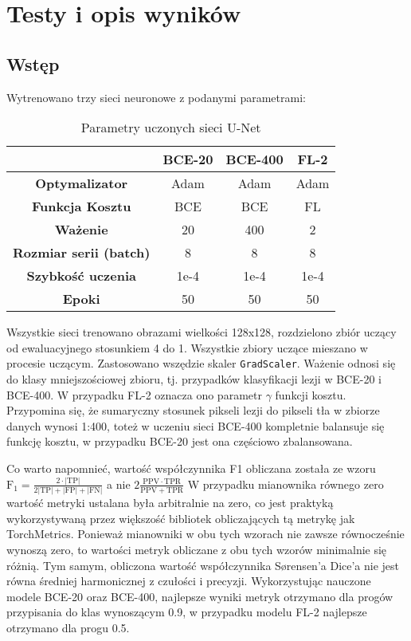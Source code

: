 \section{Testy i opis wyników}
\label{sec:Tests}
\subsection{Wstęp}

Wytrenowano trzy sieci neuronowe z podanymi parametrami:
\begin{table}[H]
	\centering
	\caption{Parametry uczonych sieci U-Net}
	\begin{tabular}{|c|c|c|c|}
		\hline
		\textbf{} & \textbf{BCE-20} & \textbf{BCE-400} & \textbf{FL-2} \\
		\hline
		\textbf{Optymalizator} & Adam & Adam & Adam \\
		\hline
		\textbf{Funkcja Kosztu} & BCE & BCE & FL \\
		\hline
		\textbf{Ważenie} & 20 & 400 & 2 \\
		\hline
		\textbf{Rozmiar serii (batch)} & 8 & 8 & 8 \\
		\hline
		\textbf{Szybkość uczenia} &1e-4 & 1e-4&1e-4\\
		\hline
		\textbf{Epoki} & 50  & 50 & 50 \\
		\hline
	\end{tabular}
	\label{tab:mytable}
\end{table}
\par
Wszystkie sieci trenowano obrazami wielkości 128x128, rozdzielono zbiór uczący od ewaluacyjnego stosunkiem 4 do 1. Wszystkie zbiory uczące mieszano w procesie uczącym. Zastosowano wszędzie skaler \texttt{GradScaler}. Ważenie odnosi się do klasy mniejszościowej zbioru, tj. przypadków klasyfikacji lezji w BCE-20 i BCE-400. W przypadku FL-2 oznacza ono parametr $\gamma$ funkcji kosztu. Przypomina się, że sumaryczny stosunek pikseli lezji do pikseli tła w zbiorze danych wynosi 1:400, toteż w uczeniu sieci BCE-400 kompletnie balansuje się funkcję kosztu, w przypadku BCE-20 jest ona częściowo zbalansowana. 

\par
Co warto napomnieć, wartość współczynnika F1 obliczana została ze wzoru  $ \mathrm{F_1 = \frac{2\cdot{}|TP|}{2|TP|+|FP|+|FN|}}$ a nie  $\mathrm{2\frac{PPV\cdot{}TPR}{PPV+TPR}}$ W przypadku mianownika równego zero wartość metryki ustalana była arbitralnie na zero, co jest praktyką wykorzystywaną przez większość bibliotek obliczających tą metrykę jak TorchMetrics. Ponieważ mianowniki w obu tych wzorach nie zawsze równocześnie wynoszą zero, to wartości metryk obliczane z obu tych wzorów minimalnie się różnią. Tym samym, obliczona wartość współczynnika Sørensen'a Dice'a nie jest równa średniej harmonicznej z czułości i precyzji. Wykorzystując nauczone modele BCE-20 oraz BCE-400, najlepsze wyniki metryk otrzymano dla progów przypisania do klas wynoszącym 0.9, w przypadku modelu FL-2 najlepsze otrzymano dla progu 0.5.

